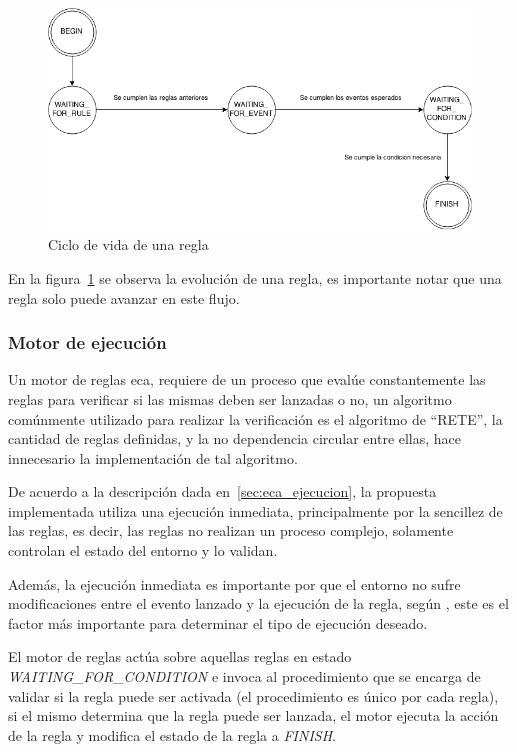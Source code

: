 \begin{figure}
\centering
\includegraphics[width=12cm]{solucion/images/rules_flow.png}
\caption{Ciclo de vida de una regla}
\label{fig:rule_flow}
\end{figure}

En la figura~\ref{fig:rule_flow} se observa la evolución de una regla, es
importante notar que una regla solo puede avanzar en este flujo.

\subsubsection{Motor de ejecución}

Un motor de reglas \gls{eca}, requiere de un proceso que evalúe constantemente
las reglas para verificar si las mismas deben ser lanzadas o
no\cite{bailey2004event,galton2002two}, un algoritmo comúnmente utilizado para
realizar la verificación es el algoritmo de \enquote{RETE}\cite{de2001eca}, la cantidad de
reglas definidas, y la no dependencia circular entre ellas, hace innecesario la
implementación de tal algoritmo\cite{de2001eca}. 

De acuerdo a la descripción dada en~\ref{sec:eca_ejecucion}, la propuesta
implementada utiliza una ejecución inmediata, principalmente por la sencillez
de las reglas, es decir, las reglas no realizan un proceso complejo, solamente
controlan el estado del entorno y lo validan.

Además, la ejecución inmediata es importante por que el entorno no sufre
modificaciones entre el evento lanzado y la ejecución de la regla, según
\cite{bailey2004event}, este es el factor más importante para determinar el tipo
de ejecución deseado.

El motor de reglas actúa sobre aquellas reglas en estado
\emph{WAITING\_FOR\_CONDITION} e invoca al procedimiento que se encarga de
validar si la regla puede ser activada (el procedimiento es único por cada
regla), si el mismo determina que la regla puede ser lanzada, el motor ejecuta
la acción de la regla y modifica el estado de la regla a \emph{FINISH}.

